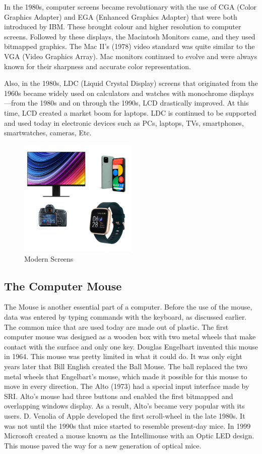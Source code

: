 \documentclass{article}
\begin{document}
In the 1980s, computer screens became revolutionary with the use of CGA (Color Graphics Adapter) and EGA (Enhanced Graphics Adapter) that were both introduced by IBM. These brought colour and higher resolution to computer screens. Followed by these displays, the Macintosh Monitors came, and they used bitmapped graphics. The Mac II's (1978) video standard was quite similar to the VGA (Video Graphics Array). Mac monitors continued to evolve and were always known for their sharpness and accurate color representation.

Also, in the 1980s, LDC (Liquid Crystal Display) screens that originated from the 1960s became widely used on calculators and watches with monochrome displays—from the 1980s and on through the 1990s, LCD drastically improved. At this time, LCD created a market boom for laptops. LDC is continued to be supported and used today in electronic devices such as PCs, laptops, TVs, smartphones, smartwatches, cameras, Etc.
\cite{ref5}

\begin{figure}[!h]
    \caption{Modern Screens}
    \label{image:MODERNSCREENS}
    \centering
    \includegraphics[width=0.5\textwidth]{pics/modern_screens.png}
\end{figure}

\subsection{The Computer Mouse}
The Mouse is another essential part of a computer. Before the use of the mouse, data was entered by typing commands with the keyboard, as discussed earlier. The common mice that are used today are made out of plastic. The first computer mouse was designed as a wooden box with two metal wheels that make contact with the surface and only one key. Douglas Engelbart invented this mouse in 1964. This mouse was pretty limited in what it could do. It was only eight years later that Bill English created the Ball Mouse. The ball replaced the two metal wheels that Engelbart's mouse, which made it possible for this mouse to move in every direction. The Alto (1973) had a special input interface made by SRI. Alto's mouse had three buttons and enabled the first bitmapped and overlapping windows display. As a result, Alto's became very popular with its users. D. Venolia of Apple developed the first scroll-wheel in the late 1980s. It was not until the 1990s that mice started to resemble present-day mice. In 1999 Microsoft created a mouse known as the Intellimouse with an Optic LED design. This mouse paved the way for a new generation of optical mice.
\cite{ref6} \cite{ref7}
\end{document}
